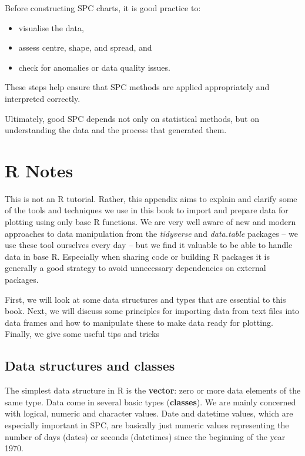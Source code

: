 \documentclass[
]{book}
\providecommand{\tightlist}{%
  \setlength{\itemsep}{0pt}\setlength{\parskip}{0pt}}
\begin{document}
Before constructing SPC charts, it is good practice to:

\begin{itemize}
\tightlist
\item
  visualise the data,
\item
  assess centre, shape, and spread, and
\item
  check for anomalies or data quality issues.
\end{itemize}

These steps help ensure that SPC methods are applied appropriately and interpreted correctly.

Ultimately, good SPC depends not only on statistical methods, but on understanding the data and the process that generated them.

\chapter{R Notes}\label{r-notes}

This is not an R tutorial. Rather, this appendix aims to explain and clarify some of the tools and techniques we use in this book to import and prepare data for plotting using only base R functions. We are very well aware of new and modern approaches to data manipulation from the \emph{tidyverse} and \emph{data.table} packages -- we use these tool ourselves every day -- but we find it valuable to be able to handle data in base R. Especially when sharing code or building R packages it is generally a good strategy to avoid unnecessary dependencies on external packages.

First, we will look at some data structures and types that are essential to this book. Next, we will discuss some principles for importing data from text files into data frames and how to manipulate these to make data ready for plotting. Finally, we give some useful tips and tricks

\section{Data structures and classes}\label{data-structures-and-classes}

The simplest data structure in R is the \textbf{vector}: zero or more data elements of the same type. Data come in several basic types (\textbf{classes}). We are mainly concerned with logical, numeric and character values. Date and datetime values, which are especially important in SPC, are basically just numeric values representing the number of days (dates) or seconds (datetimes) since the beginning of the year 1970.
\end{document}
